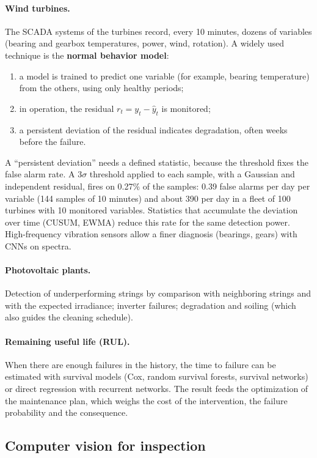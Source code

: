 \documentclass[10pt,a4paper,oneside]{article}
\begin{document}
\paragraph{Wind turbines.} The SCADA systems of the turbines record, every
10 minutes, dozens of variables (bearing and gearbox temperatures, power,
wind, rotation). A widely used technique is the \textbf{normal behavior
model}:
\begin{enumerate}
  \item a model is trained to predict one variable (for example, bearing
    temperature) from the others, using only healthy periods;
  \item in operation, the residual $r_t = y_t - \hat{y}_t$ is monitored;
  \item a persistent deviation of the residual indicates degradation, often
    weeks before the failure.
\end{enumerate}
A ``persistent deviation'' needs a defined statistic, because the threshold
fixes the false alarm rate. A $3\sigma$ threshold applied to each sample,
with a Gaussian and independent residual, fires on 0.27\% of the samples:
0.39 false alarms per day per variable (144 samples of 10 minutes) and about
390 per day in a fleet of 100 turbines with 10 monitored variables.
Statistics that accumulate the deviation over time (CUSUM, EWMA) reduce this
rate for the same detection power.
High-frequency vibration sensors allow a finer diagnosis (bearings, gears)
with CNNs on spectra.

\paragraph{Photovoltaic plants.} Detection of underperforming strings by
comparison with neighboring strings and with the expected irradiance;
inverter failures; degradation and soiling (which also guides the cleaning
schedule).

\paragraph{Remaining useful life (RUL).} When there are enough failures in
the history, the time to failure can be estimated with survival models (Cox,
random survival forests, survival networks) or direct regression with
recurrent networks. The result feeds the optimization of the maintenance
plan, which weighs the cost of the intervention, the failure probability and
the consequence.

\subsection{Computer vision for inspection}
\end{document}
